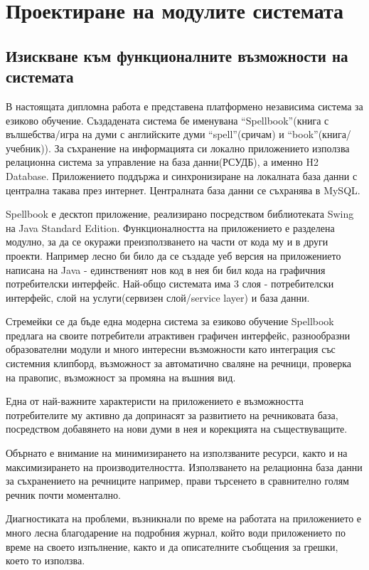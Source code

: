 \chapter{Проектиране на модулите системата}
\section{Изискване към функционалните възможности на системата}
В настоящата дипломна работа е представена платформено независима
система за езиково обучение. Създадената система бе именувана
"`Spellbook"'(книга с вълшебства/игра на думи с английските думи
"`spell"'(сричам) и "`book"'(книга/учебник)). За съхранение на
информацията си локално приложението използва релационна система за
управление на база данни(РСУДБ), а именно H2 Database. Приложението
поддържа и синхронизиране на локалната база данни с централна такава
през интернет. Централната база данни се съхранява в MySQL.

Spellbook е десктоп приложение, реализирано посредством библиотеката
Swing на Java Standard Edition. Функционалността на приложението е
разделена модулно, за да се окуражи преизползването на части от кода
му и в други проекти. Например лесно би било да се създаде уеб версия
на приложението написана на Java - единственият нов код в нея би бил
кода на графичния потребителски интерфейс. Най-общо системата има 3
слоя - потребителски интерфейс, слой на услуги(сервизен слой/service
layer) и база данни.

Стремейки се да бъде една модерна система за езиково обучение
Spellbook предлага на своите потребители атрактивен графичен интерфейс,
разнообразни образователни модули и много интересни възможности като
интеграция със системния клипборд, възможност за автоматично сваляне
на речници, проверка на правопис, възможност за промяна на въшния
вид. 

Една от най-важните характеристи на приложението е възможността
потребителите му активно да допринасят за развитието на речниковата
база, посредством добавянето на нови думи в нея и корекцията на
съществуващите. 

Обърнато е внимание на минимизирането на използваните ресурси, както и
на максимизирането на производителността. Използването на релационна
база данни за съхранението на речниците например, прави търсенето в
сравнително голям речник почти моментално. 

Диагностиката на проблеми, възникнали по време на работата на
приложението е много лесна благодарение на подробния журнал, който
води приложението по време на своето изпълнение, както и да описателните
съобщения за грешки, което то използва. 

